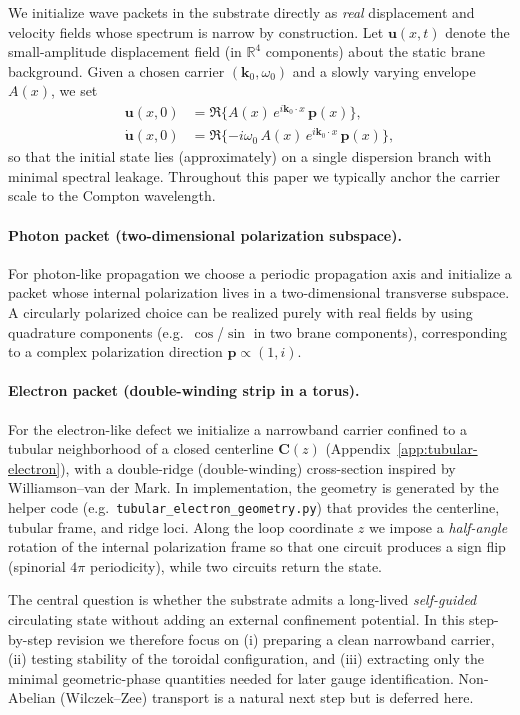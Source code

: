 We initialize wave packets in the substrate directly as \emph{real} displacement
and velocity fields whose spectrum is narrow by construction. Let
$\mathbf{u}(x,t)$ denote the small-amplitude displacement field (in
$\mathbb{R}^4$ components) about the static brane background. Given a chosen
carrier $(\mathbf{k}_0,\omega_0)$ and a slowly varying envelope $A(x)$, we set
\begin{align}
\mathbf{u}(x,0) &= \Re\{A(x)\,e^{i\mathbf{k}_0\cdot x}\,\mathbf{p}(x)\},\\
\dot{\mathbf{u}}(x,0) &= \Re\{-i\omega_0\,A(x)\,e^{i\mathbf{k}_0\cdot x}\,\mathbf{p}(x)\},
\end{align}
so that the initial state lies (approximately) on a single dispersion branch
with minimal spectral leakage. Throughout this paper we typically anchor the
carrier scale to the Compton wavelength.

\paragraph{Photon packet (two-dimensional polarization subspace).}
For photon-like propagation we choose a periodic propagation axis and initialize
a packet whose internal polarization lives in a two-dimensional transverse
subspace. A circularly polarized choice can be realized purely with real fields
by using quadrature components (e.g.\ $\cos$/$\sin$ in two brane components),
corresponding to a complex polarization direction $\mathbf{p}\propto(1,i)$.

\paragraph{Electron packet (double-winding strip in a torus).}
For the electron-like defect we initialize a narrowband carrier confined to a tubular neighborhood of a
closed centerline $\mathbf{C}(z)$ (Appendix~\ref{app:tubular-electron}), with a double-ridge
(double-winding) cross-section inspired by Williamson--van der Mark. In implementation, the geometry
is generated by the helper code (e.g.\ \texttt{tubular\_electron\_geometry.py}) that provides the
centerline, tubular frame, and ridge loci.
Along the loop coordinate $z$ we impose a \emph{half-angle} rotation of the internal polarization
frame so that one circuit produces a sign flip (spinorial $4\pi$ periodicity), while two circuits
return the state.

The central question is whether the substrate admits a long-lived \emph{self-guided} circulating state
without adding an external confinement potential. In this step-by-step revision we therefore focus on
(i) preparing a clean narrowband carrier, (ii) testing stability of the toroidal configuration, and
(iii) extracting only the minimal geometric-phase quantities needed for later gauge identification.
Non-Abelian (Wilczek--Zee) transport is a natural next step but is deferred here.

